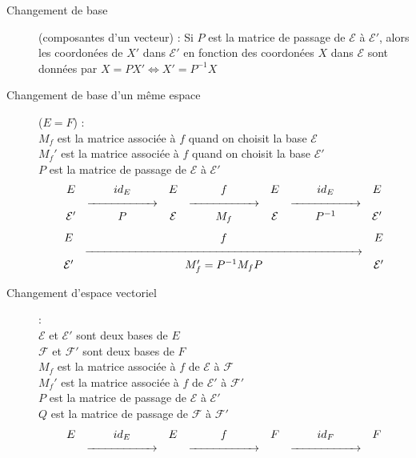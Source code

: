 \begin{description}
\begin{center}
\begin{tabular}[h!]{cc}
        \end{tabular}
    \end{center}
\item[Changement de base] (composantes d'un vecteur) : Si $P$ est la matrice de passage
    de $\mathcal E$ à $\mathcal E'$, alors les coordonées de $X'$ dans $\mathcal E'$
    en fonction des coordonées $X$ dans $\mathcal E$ sont données par
    $X=PX'\Leftrightarrow X'=P^{-1}X$
\item[Changement de base d'un même espace] ($E=F$) :\\
    $M_f$ est la matrice associée à $f$ quand on choisit la base $\mathcal E$\\
    $M_f'$ est la matrice associée à $f$ quand on choisit la base $\mathcal E'$\\
    $P$ est la matrice de passage de $\mathcal E$ à $\mathcal E'$
    \[\begin{matrix}
        E & id_E & E & f & E & id_E & E\\
        & \xrightarrow{\makebox[2cm]{}} & & \xrightarrow{\makebox[2cm]{}} & & \xrightarrow{\makebox[2cm]{}}\\
        \mathcal{E'} & P & \mathcal{E} & M_f & \mathcal{E} & P^{-1} & \mathcal{E'}\\
    \end{matrix}\]
    \[\begin{matrix}
        E & f & E\\
        & \xrightarrow{\makebox[8.5cm]{}} & \\
        \mathcal{E'} & M_f'=P^{-1}M_fP & \mathcal{E'}
    \end{matrix}\]
\item[Changement d'espace vectoriel] :\\
    $\mathcal E$ et $\mathcal E'$ sont deux bases de $E$\\
    $\mathcal F$ et $\mathcal F'$ sont deux bases de $F$\\
    $M_f$ est la matrice associée à $f$ de $\mathcal E$ à $\mathcal F$\\
    $M_f'$ est la matrice associée à $f$ de $\mathcal E'$ à $\mathcal F'$\\
    $P$ est la matrice de passage de $\mathcal E$ à $\mathcal E'$\\
    $Q$ est la matrice de passage de $\mathcal F$ à $\mathcal F'$\\
    \[\begin{matrix}
        E & id_E & E & f & F & id_F & F\\
        & \xrightarrow{\makebox[2cm]{}} & & \xrightarrow{\makebox[2cm]{}} & & \xrightarrow{\makebox[2cm]{}}\\

\end{matrix}\]
\end{description}
